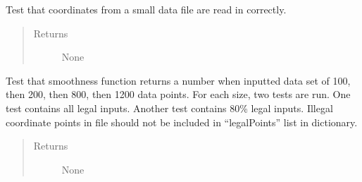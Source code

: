 \documentclass[letterpaper,10pt,english]{sphinxmanual}
\begin{document}
\begin{fulllineitems}
\begin{fulllineitems}
\begin{quote}
\begin{description}
\end{description}\end{quote}

\end{fulllineitems}


\begin{fulllineitems}
\label{\detokenize{index:src.Tests.Graph_Test.Graph_Test.test_readCoordinates_small_legal}}
Test that coordinates from a small data file are read in correctly.
\begin{quote}\begin{description}
\item[{Returns}] \leavevmode
None

\end{description}\end{quote}

\end{fulllineitems}


\begin{fulllineitems}
\label{\detokenize{index:src.Tests.Graph_Test.Graph_Test.test_smoothnessComputes}}
Test that smoothness function returns a number when inputted data set of 100, then 200, then 800,
then 1200 data points. For each size, two tests are run.
One test contains all legal inputs. Another test contains 80\% legal inputs.
Illegal coordinate points in file should not be included in “legalPoints” list in dictionary.
\begin{quote}\begin{description}
\item[{Returns}] \leavevmode
None

\end{description}\end{quote}

\end{fulllineitems}



\end{fulllineitems}
\end{document}
